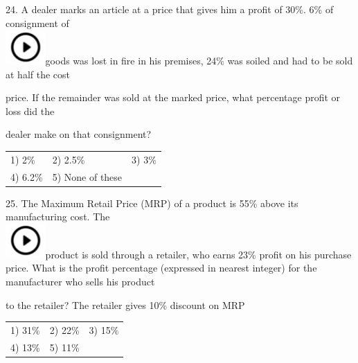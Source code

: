 \documentclass{article}
\begin{document}
	24. A dealer marks an article at a price that gives him a profit of 30\%. 6\% of consignment of \noindent \\ \includegraphics*[width=0.60in, height=0.52in]{images/image1}goods was lost in fire in his premises, 24\% was soiled and had to be sold at half the cost
	
	\noindent price. If the remainder was sold at the marked price, what percentage profit or loss did the
	
	\noindent 
	
	\noindent dealer make on that consignment?
	
	\noindent 
	
	\noindent  
	\begin{tabular}{p{1.7in} p{1.6in} p{1.6in}} \\ 
 1) 2\%                      & 2) 2.5\%             & 3) 3\%                \\
4) 6.2\%             & 5) None of these  \\
\end{tabular}
	
	\noindent 
	
	\noindent 
	
	\noindent 
	
	25. The Maximum Retail Price (MRP) of a product is 55\% above its manufacturing cost. The \noindent \\ \includegraphics*[width=0.60in, height=0.52in]{images/image1}product is sold through a retailer, who earns 23\% profit on his purchase price. What is the profit percentage (expressed in nearest integer) for the manufacturer who sells his product
	
	\noindent 
	
	\noindent to the retailer? The retailer gives 10\% discount on MRP
	
	\noindent 
	
	\noindent  
	\begin{tabular}{p{1.7in} p{1.6in} p{1.6in}} \\ 
 1) 31\%                    & 2) 22\%              & 3) 15\%              \\
4) 13\%              & 5) 11\% \\
\end{tabular}
	
\end{document}
